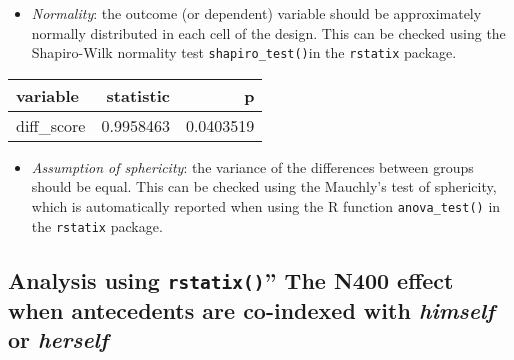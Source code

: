 \documentclass[
]{article}
\providecommand{\tightlist}{%
  \setlength{\itemsep}{0pt}\setlength{\parskip}{0pt}}
\begin{document}
\begin{itemize}
\tightlist
\item
  \emph{Normality}: the outcome (or dependent) variable should be
  approximately normally distributed in each cell of the design. This
  can be checked using the Shapiro-Wilk normality test
  \texttt{shapiro\_test()}in the \texttt{rstatix} package.
\end{itemize}

\begin{longtable}[]{@{}lrr@{}}
\toprule\noalign{}
variable & statistic & p \\
\midrule\noalign{}
\endhead
\bottomrule\noalign{}
\endlastfoot
diff\_score & 0.9958463 & 0.0403519 \\
\end{longtable}

\begin{itemize}
\tightlist
\item
  \emph{Assumption of sphericity}: the variance of the differences
  between groups should be equal. This can be checked using the
  Mauchly's test of sphericity, which is automatically reported when
  using the R function \texttt{anova\_test()} in the \texttt{rstatix}
  package.
\end{itemize}

\subsection{\texorpdfstring{Analysis using \texttt{rstatix()}'' The N400
effect when antecedents are co-indexed with \emph{himself} or
\emph{herself}}{Analysis using rstatix()'' The N400 effect when antecedents are co-indexed with himself or herself}}\label{analysis-using-rstatix-the-n400-effect-when-antecedents-are-co-indexed-with-himself-or-herself}
\end{document}
